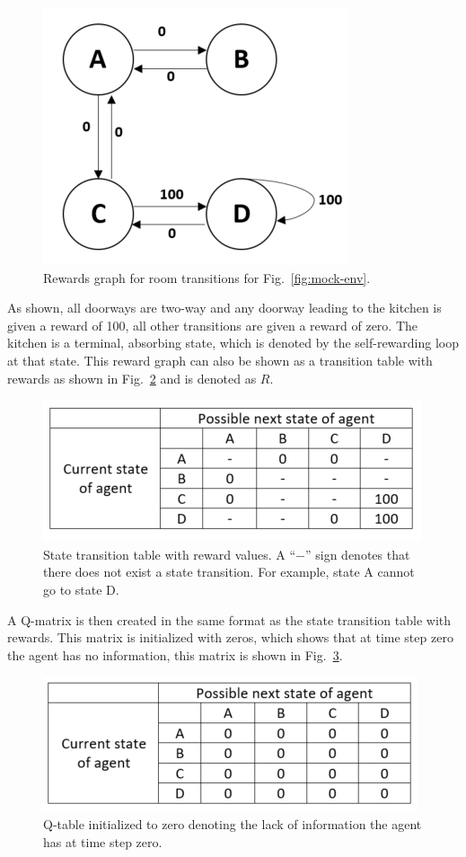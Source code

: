 \documentclass[12pt,american]{report}
\begin{document}
\begin{figure}
\centering
\includegraphics[scale=1]{images/mock-env-rewards.png}
\caption{Rewards graph for room transitions for Fig.~\ref{fig:mock-env}.}
\label{fig:mock-env-rewards}
\end{figure}
As shown, all doorways are two-way and any doorway leading to the kitchen is given a reward of 100, all other transitions are given a reward of zero.  The kitchen is a terminal, absorbing state, which is denoted by the self-rewarding loop at that state.  This reward graph can also be shown as a transition table with rewards as shown in Fig.~\ref{fig:q-mock-env-table} and is denoted as $R$. 
\begin{figure}
\centering
\includegraphics[scale=1.5]{images/q-mock-env-table.png}
\caption{State transition table with reward values. A ``$-$'' sign denotes that there does not exist a state transition. For example, state A cannot go to state D.}
\label{fig:q-mock-env-table}
\end{figure}
A Q-matrix is then created in the same format as the state transition table with rewards.  This matrix is initialized with zeros, which shows that at time step zero the agent has no information, this matrix is shown in Fig.~\ref{fig:mock-q-table}.
\begin{figure}
\centering
\includegraphics[scale=1.5]{images/mock-q-table.png}
\caption{Q-table initialized to zero denoting the lack of information the agent has at time step zero.}
\label{fig:mock-q-table}
\end{figure}
\end{document}
